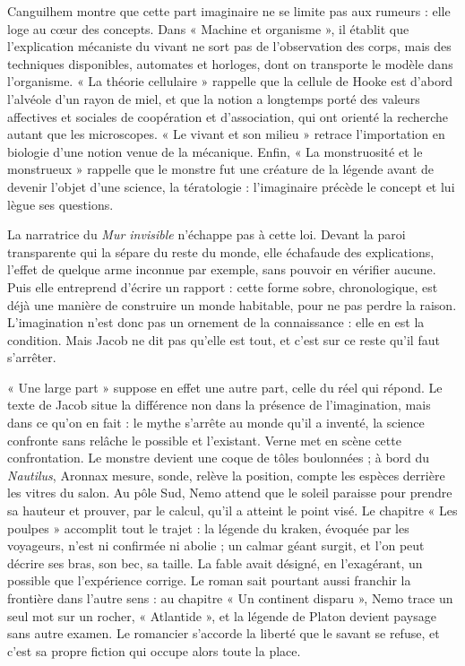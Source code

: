 \documentclass[11pt,a4paper]{article}
\begin{document}
Canguilhem montre que cette part imaginaire ne se limite pas aux rumeurs : elle loge au cœur des concepts. Dans « Machine et organisme », il établit que l'explication mécaniste du vivant ne sort pas de l'observation des corps, mais des techniques disponibles, automates et horloges, dont on transporte le modèle dans l'organisme. « La théorie cellulaire » rappelle que la cellule de Hooke est d'abord l'alvéole d'un rayon de miel, et que la notion a longtemps porté des valeurs affectives et sociales de coopération et d'association, qui ont orienté la recherche autant que les microscopes. « Le vivant et son milieu » retrace l'importation en biologie d'une notion venue de la mécanique. Enfin, « La monstruosité et le monstrueux » rappelle que le monstre fut une créature de la légende avant de devenir l'objet d'une science, la tératologie : l'imaginaire précède le concept et lui lègue ses questions.

La narratrice du \emph{Mur invisible} n'échappe pas à cette loi. Devant la paroi transparente qui la sépare du reste du monde, elle échafaude des explications, l'effet de quelque arme inconnue par exemple, sans pouvoir en vérifier aucune. Puis elle entreprend d'écrire un rapport : cette forme sobre, chronologique, est déjà une manière de construire un monde habitable, pour ne pas perdre la raison. L'imagination n'est donc pas un ornement de la connaissance : elle en est la condition. Mais Jacob ne dit pas qu'elle est tout, et c'est sur ce reste qu'il faut s'arrêter.

« Une large part » suppose en effet une autre part, celle du réel qui répond. Le texte de Jacob situe la différence non dans la présence de l'imagination, mais dans ce qu'on en fait : le mythe s'arrête au monde qu'il a inventé, la science confronte sans relâche le possible et l'existant. Verne met en scène cette confrontation. Le monstre devient une coque de tôles boulonnées ; à bord du \emph{Nautilus}, Aronnax mesure, sonde, relève la position, compte les espèces derrière les vitres du salon. Au pôle Sud, Nemo attend que le soleil paraisse pour prendre sa hauteur et prouver, par le calcul, qu'il a atteint le point visé. Le chapitre « Les poulpes » accomplit tout le trajet : la légende du kraken, évoquée par les voyageurs, n'est ni confirmée ni abolie ; un calmar géant surgit, et l'on peut décrire ses bras, son bec, sa taille. La fable avait désigné, en l'exagérant, un possible que l'expérience corrige. Le roman sait pourtant aussi franchir la frontière dans l'autre sens : au chapitre « Un continent disparu », Nemo trace un seul mot sur un rocher, « Atlantide », et la légende de Platon devient paysage sans autre examen. Le romancier s'accorde la liberté que le savant se refuse, et c'est sa propre fiction qui occupe alors toute la place.
\end{document}
